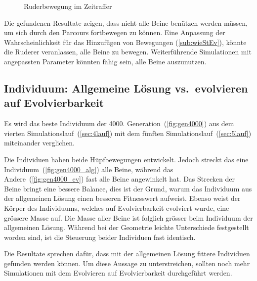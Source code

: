 \begin{figure}[H]
        \caption{Ruderbewegung im Zeitraffer\label{fig:ruder}}

      \end{figure}

      Die gefundenen Resultate zeigen,
      dass nicht alle Beine benützen werden müssen, um sich durch den Parcours fortbewegen zu können.
      Eine Anpassung der Wahrscheinlichkeit für das Hinzufügen von Bewegungen (\vref{sub:wieStEv}),
      könnte die Ruderer veranlassen, alle Beine zu bewegen.
      Weiterführende Simulationen mit angepassten Parameter könnten fähig sein, alle Beine auszunutzen.

    \subsection{Individuum: Allgemeine Lösung vs.\ evolvieren auf Evolvierbarkeit}

      Es wird das beste Individuum der 4000. Generation~(\vref{fig:gen4000}) aus dem vierten Simulationslauf~(\vref{sec:4lauf})
      mit dem fünften Simulationslauf~(\vref{sec:5lauf}) miteinander verglichen.

      \medskip

      Die Individuen haben beide Hüpfbewegungen entwickelt.
      Jedoch streckt das eine Individuum~(\vref{fig:gen4000_alg}) alle Beine,
      während das Andere~(\vref{fig:gen4000_ev}) fast alle Beine angewinkelt hat.
      Das Strecken der Beine bringt eine bessere Balance,
      dies ist der Grund, warum das Individuum aus der allgemeinen Lösung einen besseren Fitnesswert aufweist.
      Ebenso weist der Körper des Individuums, welches auf Evolvierbarkeit evolviert wurde, eine grössere Masse auf.
      Die Masse aller Beine ist folglich grösser beim Individuum der allgemeinen Lösung.
      Während bei der Geometrie leichte Unterschiede festgestellt worden sind,
      ist die Steuerung beider Individuen fast identisch.

      \medskip

      Die Resultate sprechen dafür, dass mit der allgemeinen Lösung fittere Individuen gefunden werden können.
      Um diese Aussage zu unterstreichen,
      sollten noch mehr Simulationen mit dem Evolvieren auf Evolvierbarkeit durchgeführt werden.

